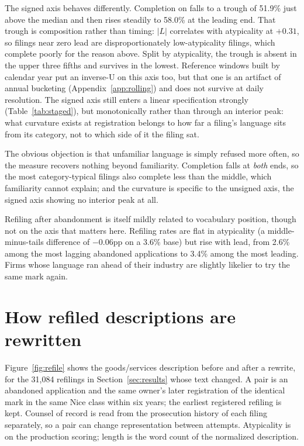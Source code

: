 The signed axis behaves differently. Completion on \dkl{} falls to a trough of
51.9\% just above the median and then rises steadily to 58.0\% at the leading
end. That trough is composition rather than timing: $|L|$ correlates with
atypicality at $+0.31$, so filings near zero lead are disproportionately
low-atypicality filings, which complete poorly for the reason above. Split by
atypicality, the trough is absent in the upper three fifths and survives in
the lowest. Reference windows built by calendar year put an inverse-U on this
axis too, but that one is an artifact of annual bucketing
(Appendix~\ref{app:rolling}) and does not survive at daily resolution. The
signed axis still enters a linear specification strongly
(Table~\ref{tab:staged}), but monotonically rather than through an interior
peak: what curvature exists at registration belongs to how far a filing's
language sits from its category, not to which side of it the filing sat.

The obvious objection is that unfamiliar language is simply refused more
often, so the measure recovers nothing beyond familiarity. Completion falls at
\emph{both} ends, so the most category-typical filings also complete less than
the middle, which familiarity cannot explain; and the curvature is specific to
the unsigned axis, the signed axis showing no interior peak at all.

Refiling after abandonment is itself mildly related to vocabulary position,
though not on the axis that matters here. Refiling rates are flat in
atypicality (a middle-minus-tails difference of $-0.06$pp on a 3.6\% base) but
rise with lead, from 2.6\% among the most lagging abandoned applications to
3.4\% among the most leading. Firms whose language ran ahead of their industry
are slightly likelier to try the same mark again.

\section{How refiled descriptions are rewritten}\label{app:refile}

Figure~\ref{fig:refile} shows the goods/services description before and
after a rewrite, for the 31{,}084 refilings in Section~\ref{sec:results}
whose text changed. A pair is an abandoned application and the same owner's
later registration of the identical mark in the same Nice class within six
years; the earliest registered refiling is kept. Counsel of record is read
from the prosecution history of each filing separately, so a pair can change
representation between attempts. Atypicality is on the production scoring;
length is the word count of the normalized description.


